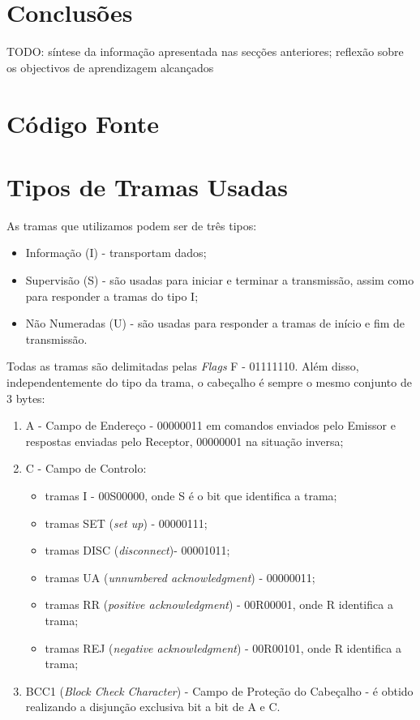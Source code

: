 \documentclass[11pt,a4paper,reqno]{report}
\numberwithin{equation}{section}
\begin{document}
\chapter{Conclusões}

TODO: síntese da informação apresentada nas secções anteriores; reflexão sobre os objectivos de aprendizagem alcançados





\begin{appendices}

\chapter{Código Fonte}


\chapter{Tipos de Tramas Usadas}
\label{tramas}

As tramas que utilizamos podem ser de três tipos:
\begin{itemize}
	\item Informação (I) - transportam dados;
	\item Supervisão (S) - são usadas para iniciar e terminar a transmissão, assim como para responder a tramas do tipo I;
	\item Não Numeradas (U) - são usadas para responder a tramas de início e fim de transmissão.
\end{itemize}

Todas as tramas são delimitadas pelas \emph{Flags} F - 01111110. Além disso, independentemente do tipo da trama, o cabeçalho é sempre o mesmo conjunto de 3 bytes:
\begin{enumerate}
	\item A - Campo de Endereço - 00000011 em comandos enviados pelo Emissor e respostas enviadas pelo Receptor, 00000001 na situação inversa;
	\item C - Campo de Controlo:
		\begin{itemize}
			\item tramas I - 00S00000, onde S é o bit que identifica a trama;
			\item tramas SET (\emph{set up}) - 00000111;
			\item tramas DISC (\emph{disconnect})- 00001011;
			\item tramas UA (\emph{unnumbered acknowledgment}) - 00000011;
			\item tramas RR (\emph{positive acknowledgment}) - 00R00001, onde R identifica a trama;
			\item tramas REJ (\emph{negative acknowledgment}) - 00R00101, onde R identifica a trama;
		\end{itemize}
	\item BCC1 (\emph{Block Check Character}) - Campo de Proteção do Cabeçalho - é obtido realizando a disjunção exclusiva bit a bit de A e C.
\end{enumerate} 


\end{appendices}
\end{document}
